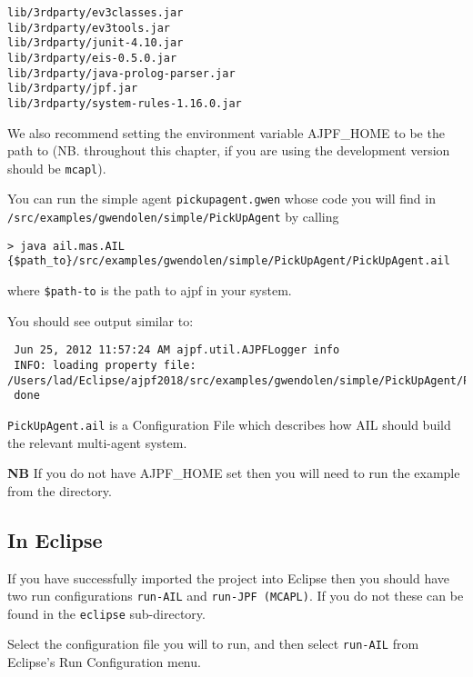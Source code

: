 \begin{verbatim}
lib/3rdparty/ev3classes.jar
lib/3rdparty/ev3tools.jar
lib/3rdparty/junit-4.10.jar
lib/3rdparty/eis-0.5.0.jar
lib/3rdparty/java-prolog-parser.jar
lib/3rdparty/jpf.jar
lib/3rdparty/system-rules-1.16.0.jar
\end{verbatim}

We also recommend setting the environment variable AJPF\_HOME to be the path to \texttt{\ajpfversion} (NB. throughout this chapter, if you are using the development version \texttt{\ajpfversion} should be \texttt{mcapl}).

You can run the simple agent \texttt{pickupagent.gwen} whose code you will find in \texttt{/src/examples/gwendolen/simple/PickUpAgent} by calling

\noindent \begin{lstlisting}[basicstyle=\tiny]
> java ail.mas.AIL {$path_to}/src/examples/gwendolen/simple/PickUpAgent/PickUpAgent.ail
\end{lstlisting}
\medskip

\noindent where \texttt{\${path-to}} is the path to ajpf in your system.

You should see output similar to:

\noindent \begin{lstlisting}
 Jun 25, 2012 11:57:24 AM ajpf.util.AJPFLogger info
 INFO: loading property file: /Users/lad/Eclipse/ajpf2018/src/examples/gwendolen/simple/PickUpAgent/PickUpAgent.ail
 done
\end{lstlisting}
\medskip
 
\texttt{PickUpAgent.ail} is a Configuration File which describes how AIL should build the relevant multi-agent system.

{\bf NB}  If you do not have AJPF\_HOME set then you will need to run the example from the \texttt{\ajpfversion} directory.

\subsection{In Eclipse}

If you have successfully imported the project into Eclipse then you should have two run configurations \texttt{run-AIL} and \texttt{run-JPF (MCAPL)}.  If you do not these can be found in the \texttt{eclipse} sub-directory.

Select the configuration file you will to run, and then select \texttt{run-AIL} from Eclipse's Run Configuration menu.


